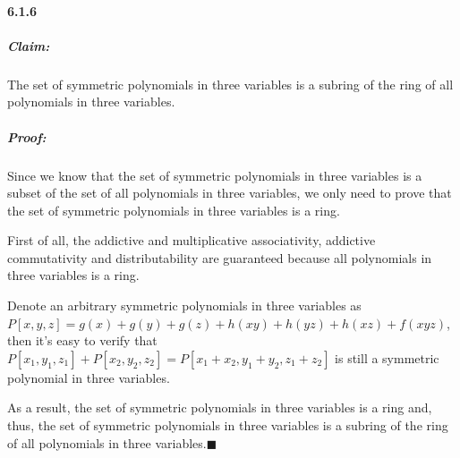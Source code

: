 \documentclass[11pt]{article}
\begin{document}
	\paragraph{6.1.6}
		\subparagraph{Claim:} The set of symmetric polynomials in three variables is a subring of the ring of all polynomials in three variables.
		\subparagraph{Proof:} Since we know that the set of symmetric polynomials in three variables is a subset of the set of all polynomials in three variables, we only need to prove that the set of symmetric polynomials in three variables is a ring.
		
		First of all, the addictive and multiplicative associativity, addictive commutativity and distributability are guaranteed because all polynomials in three variables is a ring.
		
		Denote an arbitrary symmetric polynomials in three variables as $P[x, y, z] = g(x) + g(y) + g(z) + h(xy) + h(yz) + h(xz) + f(xyz)$, then it's easy to verify that $P[x_1, y_1, z_1] + P[x_2, y_2, z_2] = P[x_1 + x_2, y_1 + y_2, z_1 + z_2]$ is still a symmetric polynomial in three variables.
		
		As a result, the set of symmetric polynomials in three variables is a ring and, thus, the set of symmetric polynomials in three variables is a subring of the ring of all polynomials in three variables.$\blacksquare$
\end{document}
